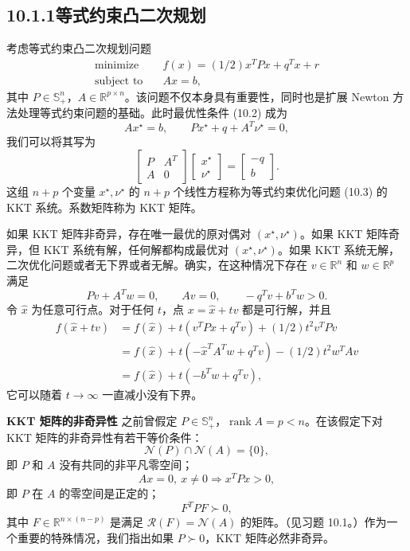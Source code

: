 \documentclass[UTF8, 12pt, fontset=fandol, oneside]{ctexart}
\begin{document}
\subsection*{10.1.1\quad 等式约束凸二次规划}

考虑等式约束凸二次规划问题
\begin{equation}
\begin{aligned}
\text{minimize}\quad & f(x)=(1/2)x^TPx+q^Tx+r\\
\text{subject to}\quad & Ax=b,
\end{aligned}
\tag{10.3}
\end{equation}
其中 $P\in\mathbb{S}_+^n$，$A\in\mathbb{R}^{p\times n}$。该问题不仅本身具有重要性，同时也是扩展 Newton 方法处理等式约束问题的基础。此时最优性条件 (10.2) 成为
\[
Ax^\star=b,\qquad Px^\star+q+A^T\nu^\star=0,
\]
我们可以将其写为
\begin{equation}
\begin{bmatrix}
P & A^T\\
A & 0
\end{bmatrix}
\begin{bmatrix}
x^\star\\
\nu^\star
\end{bmatrix}
=
\begin{bmatrix}
-q\\
b
\end{bmatrix}.
\tag{10.4}
\end{equation}
这组 $n+p$ 个变量 $x^\star,\nu^\star$ 的 $n+p$ 个线性方程称为等式约束优化问题 (10.3) 的 KKT 系统。系数矩阵称为 KKT 矩阵。

如果 KKT 矩阵非奇异，存在唯一最优的原对偶对 $(x^\star,\nu^\star)$。如果 KKT 矩阵奇异，但 KKT 系统有解，任何解都构成最优对 $(x^\star,\nu^\star)$。如果 KKT 系统无解，二次优化问题或者无下界或者无解。确实，在这种情况下存在 $v\in\mathbb{R}^n$ 和 $w\in\mathbb{R}^p$ 满足
\[
Pv+A^Tw=0,\qquad Av=0,\qquad -q^Tv+b^Tw>0.
\]
令 $\hat{x}$ 为任意可行点。对于任何 $t$，点 $x=\hat{x}+tv$ 都是可行解，并且
\[
\begin{aligned}
f(\hat{x}+tv)
&=f(\hat{x})+t(v^TP\hat{x}+q^Tv)+(1/2)t^2v^TPv\\
&=f(\hat{x})+t(-\hat{x}^TA^Tw+q^Tv)-(1/2)t^2w^TAv\\
&=f(\hat{x})+t(-b^Tw+q^Tv),
\end{aligned}
\]
它可以随着 $t\to\infty$ 一直减小没有下界。

\noindent\textbf{KKT 矩阵的非奇异性}\quad
之前曾假定 $P\in\mathbb{S}_+^n$，$\operatorname{rank}A=p<n$。在该假定下对 KKT 矩阵的非奇异性有若干等价条件：
\[
\mathcal{N}(P)\cap\mathcal{N}(A)=\{0\},
\]
即 $P$ 和 $A$ 没有共同的非平凡零空间；
\[
Ax=0,\ x\neq 0\Longrightarrow x^TPx>0,
\]
即 $P$ 在 $A$ 的零空间是正定的；
\[
F^TPF\succ 0,
\]
其中 $F\in\mathbb{R}^{n\times(n-p)}$ 是满足 $\mathcal{R}(F)=\mathcal{N}(A)$ 的矩阵。（见习题 10.1。）作为一个重要的特殊情况，我们指出如果 $P\succ 0$，KKT 矩阵必然非奇异。
\end{document}
